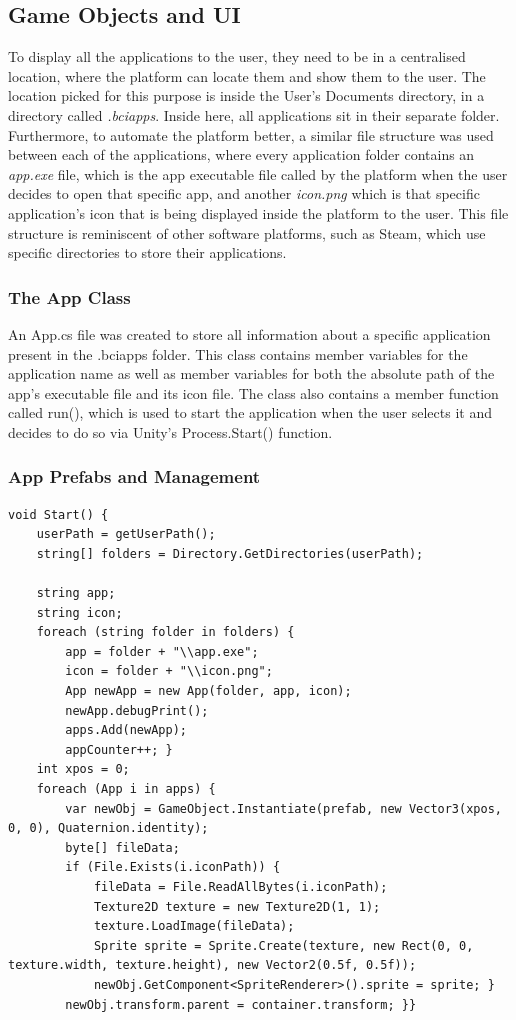 \subsection{Game Objects and UI}
 To display all the applications to the user, they need to be in a centralised location, where the platform can locate them and show them to the user. The location picked for this purpose is inside the User's Documents directory, in a directory called \textit{.bciapps}. Inside here, all applications sit in their separate folder. Furthermore, to automate the platform better, a similar file structure was used between each of the applications, where every application folder contains an \textit{app.exe} file, which is the app executable file called by the platform when the user decides to open that specific app, and another \textit{icon.png} which is that specific application's icon that is being displayed inside the platform to the user. This file structure is reminiscent of other software platforms, such as Steam, which use specific directories to store their applications.
\subsubsection{The App Class}
An App.cs file was created to store all information about a specific application present in the .bciapps folder. This class contains member variables for the application name as well as member variables for both the absolute path of the app's executable file and its icon file. The class also contains a member function called run(), which is used to start the application when the user selects it and decides to do so via Unity's Process.Start() function.
\subsubsection{App Prefabs and Management}
\begin{lstlisting}[language={[Sharp]C}, caption={Manager.cs initialisation}, label={Script}]
void Start() {
    userPath = getUserPath();
    string[] folders = Directory.GetDirectories(userPath);

    string app;
    string icon;
    foreach (string folder in folders) {
        app = folder + "\\app.exe";
        icon = folder + "\\icon.png";
        App newApp = new App(folder, app, icon);
        newApp.debugPrint();
        apps.Add(newApp);
        appCounter++; }
    int xpos = 0;
    foreach (App i in apps) {
        var newObj = GameObject.Instantiate(prefab, new Vector3(xpos, 0, 0), Quaternion.identity);
        byte[] fileData;
        if (File.Exists(i.iconPath)) {
            fileData = File.ReadAllBytes(i.iconPath);
            Texture2D texture = new Texture2D(1, 1);
            texture.LoadImage(fileData);
            Sprite sprite = Sprite.Create(texture, new Rect(0, 0, texture.width, texture.height), new Vector2(0.5f, 0.5f));
            newObj.GetComponent<SpriteRenderer>().sprite = sprite; }
        newObj.transform.parent = container.transform; }}
\end{lstlisting}



